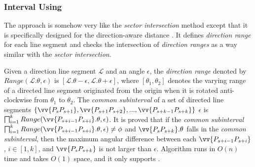 	





\vspace{-0.5ex}
\subsubsection {Interval Using \dad}
\label{sec-interval}
The \interval\cite{Ke:Interval} approach is somehow very like the \emph{sector intersection} method except that it is specifically designed for the direction-aware distance \dad. It defines \emph{direction range} for each line segment and checks the intersection of \emph{direction ranges} as a way similar with the \emph{sector intersection}.

Given a direction line segment $\mathcal{L}$ and an angle $\epsilon$, the \emph{direction range} denoted by $Range(\mathcal{L}.\theta, \epsilon)$ is $[\mathcal{L}.\theta-\epsilon, \mathcal{L}.\theta+\epsilon]$, where $[\theta_1, \theta_2]$ denotes the varying range of a directed line segment originated from the origin when it is rotated anti-clockwise from $\theta_1$ to $\theta_2$.
%
The \emph{common subinterval} of a set of directed line segments $\{\vv{P_sP_{s+1}}, \vv{P_{s+1}P_{s+2}}, ..., \vv{P_{s+k-1}P_{s+k}}\}$ \wrt $\epsilon$ is $\bigsqcap_{i=1}^{k}Range(\vv{P_{s+i-1} P_{s+i}}.\theta, \epsilon)$.
It is proved that if the \emph{common subinterval} $\bigsqcap_{i=1}^{k}Range(\vv{P_{s+i-1} P_{s+i}}.\theta, \epsilon)\ne \phi$ and $\vv{P_sP_{s+k}}.\theta$ falls in the \emph{common subinterval}, then the maximum angular difference between each $\vv{P_{s+i-1}P_{s+i}}$, $i\in [1, k]$, and $\vv{P_sP_{s+k}}$ is not larger than $\epsilon$.
%
Algorithm \interval runs in $O(n)$ time and takes $O(1)$ space, and it only supports \dad.

